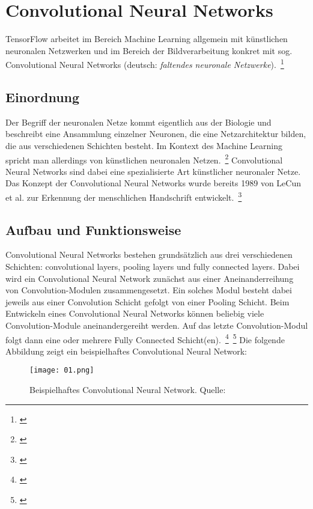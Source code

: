 \section{Convolutional Neural Networks}
TensorFlow arbeitet im Bereich Machine Learning allgemein mit künstlichen neuronalen Netzwerken und im Bereich der Bildverarbeitung konkret mit sog. Convolutional Neural Networks (deutsch: \textit{faltendes neuronale Netzwerke}).~\footnote{\cite{TensorFlow.2018b}}

\subsection{Einordnung}
Der Begriff der neuronalen Netze kommt eigentlich aus der Biologie und beschreibt eine Ansammlung einzelner Neuronen, die eine Netzarchitektur bilden, die aus verschiedenen Schichten besteht. Im Kontext des Machine Learning spricht man allerdings von künstlichen neuronalen Netzen.~\footnote{\cite{JulianMoeser.2017}} Convolutional Neural Networks sind dabei eine spezialisierte Art künstlicher neuronaler Netze. Das Konzept der Convolutional Neural Networks wurde bereits 1989 von LeCun et al. zur Erkennung der menschlichen Handschrift entwickelt.~\footnote{\cite[S.~14]{Christ.2017}}

\subsection{Aufbau und Funktionsweise}
Convolutional Neural Networks bestehen grundsätzlich aus drei verschiedenen Schichten: convolutional layers, pooling layers und fully connected layers. Dabei wird ein Convolutional Neural Network zunächst aus einer Aneinanderreihung von Convolution-Modulen zusammengesetzt. Ein solches Modul besteht dabei jeweils aus einer Convolution Schicht gefolgt von einer Pooling Schicht. Beim Entwickeln eines Convolutional Neural Networks können beliebig viele Convolution-Module aneinandergereiht werden. Auf das letzte Convolution-Modul folgt dann eine oder mehrere Fully Connected Schicht(en).~\footnote{\cite[S.~102]{HabibiAghdam.2017}}~\footnote{\cite{TensorFlow.2018b}} Die folgende Abbildung zeigt ein beispielhaftes Convolutional Neural Network:

\begin{figure}[!h]
	\texttt{[image: 01.png]}
	\caption{Beispielhaftes Convolutional Neural Network. Quelle: \cite[S.~6]{Ji.2018}}
	\label{fig:01}
\end{figure}

